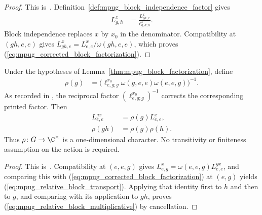 \begin{proof}\leanok
    This is~\cite[``Corrected block factorization'']{QICLean2026Blueprint}.
    Definition~\ref{def:mpug_block_independence_factor} gives
    \begin{align}
        L^x_{g,h}
         & =\frac{L^x_{gh,e}}{\ell^x_{g,h;h}}.
        \label{eq:mpug_block_factorization_first}
    \end{align}
    Block independence replaces $x$ by $x_0$ in the denominator.
    Compatibility at $(gh,e,e)$ gives
    $L^x_{gh,e}=L^x_{e,e}/\omega(gh,e,e)$, which proves
    (\ref{eq:mpug_corrected_block_factorization}).
\end{proof}

\begin{lemma}
    \label{thm:mpug_relative_block_character}
    \leanok
    Under the hypotheses of Lemma~\ref{thm:mpug_block_factorization}, define
    \begin{align}
        \rho(g)
         & =\bigl(\ell^{x_0}_{e,g;g}\omega(g,e,e)
        \omega(e,e,g)\bigr)^{-1}.
        \label{eq:mpug_relative_block_character}
    \end{align}
    As recorded in \cite{gap:fbc25_block_independence_reciprocal_errors}, the
    reciprocal factor $(\ell^{x_0}_{e,g;g})^{-1}$ corrects the corresponding
    printed factor. Then
    \begin{align}
        L^{g x}_{e,e}
         & =\rho(g)L^x_{e,e},
        \label{eq:mpug_relative_block_transport} \\
        \rho(gh)
         & =\rho(g)\rho(h).
        \label{eq:mpug_relative_block_multiplicative}
    \end{align}
    Thus $\rho\colon G\to\C^\times$ is a one-dimensional character. No
    transitivity or finiteness assumption on the action is required.
\end{lemma}

\begin{proof}\leanok
    This is~\cite[``Relative block character'']{QICLean2026Blueprint}.
    Compatibility at $(e,e,g)$ gives
    $L^x_{e,g}=\omega(e,e,g)L^{g x}_{e,e}$, and comparing this with
    (\ref{eq:mpug_corrected_block_factorization}) at $(e,g)$ yields
    (\ref{eq:mpug_relative_block_transport}). Applying that identity first
    to $h$ and then to $g$, and comparing with its application to $gh$, proves
    (\ref{eq:mpug_relative_block_multiplicative}) by cancellation.
\end{proof}

